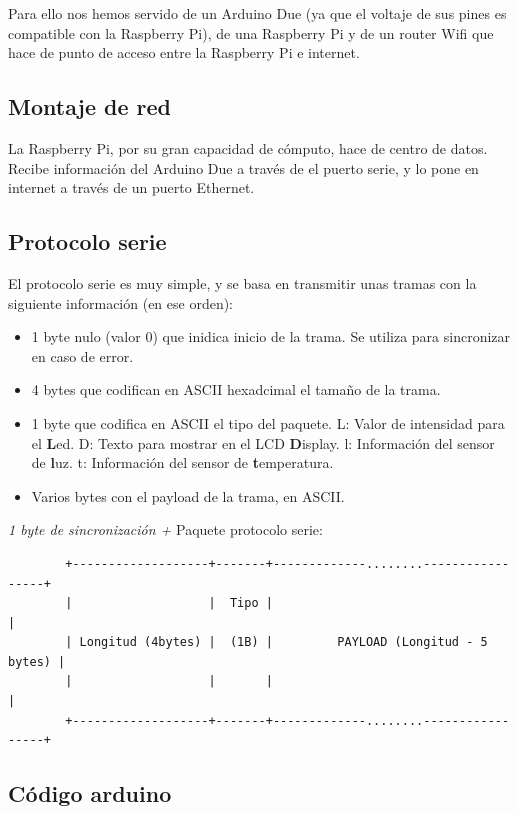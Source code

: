 \documentclass[]{article}
\begin{document}
Para ello nos hemos servido de un Arduino Due (ya que el voltaje de sus pines es compatible con la Raspberry Pi), de una Raspberry Pi y de un router Wifi que hace de punto de acceso entre la Raspberry Pi e internet.

\subsection{Montaje de red}

La Raspberry Pi, por su gran capacidad de cómputo, hace de centro de datos. Recibe información del Arduino Due a través de el puerto serie, y lo pone en internet a través de un puerto Ethernet. 

\subsection{Protocolo serie}

El protocolo serie es muy simple, y se basa en transmitir unas tramas con la siguiente información (en ese orden):

\begin{itemize}
	\item 1 byte nulo (valor 0) que inidica inicio de la trama. Se utiliza para sincronizar en caso de error.
	\item 4 bytes que codifican en ASCII hexadcimal el tamaño de la trama.
	\item 1 byte que codifica en ASCII el tipo del paquete.
		\subitem L: Valor de intensidad para el \textbf{L}ed.
		\subitem D: Texto para mostrar en el LCD \textbf{D}isplay.
		\subitem l: Información del sensor de \textbf{l}uz.
		\subitem t: Información del sensor de \textbf{t}emperatura.
	\item Varios bytes con el payload de la trama, en ASCII.
\end{itemize}


\textit{1 byte de sincronización +}
Paquete protocolo serie:
\begin{verbatim}
		+-------------------+-------+-------------........-----------------+
		|                   |  Tipo |                                      |
		| Longitud (4bytes) |  (1B) |         PAYLOAD (Longitud - 5 bytes) |
		|                   |       |                                      |
		+-------------------+-------+-------------........-----------------+
\end{verbatim}


\subsection{Código arduino}
\end{document}
